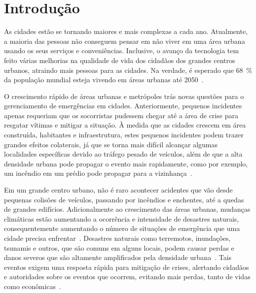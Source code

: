 \chapter{Introdução}\label{cap:introducao}

\begin{refsection}

As cidades estão se tornando maiores e mais complexas a cada ano. Atualmente, a maioria das pessoas não conseguem pensar em não viver em uma área urbana usando os seus serviços e conveniências. Inclusive, o avanço da tecnologia tem feito várias melhorias na qualidade de vida dos cidadãos dos grandes centros urbanos, atraindo mais pessoas para as cidades. Na verdade, é esperado que 68~\% da população mundial esteja vivendo em áreas urbanas até 2050~\cite{de_Amorim_2019}.

O crescimento rápido de áreas urbanas e metrópoles trás novas questões para o gerenciamento de emergências em cidades. Anteriormente, pequenos incidentes apenas requeriam que os socorristas pudessem chegar até a área de crise para resgatar vítimas e mitigar a situação. À medida que as cidades crescem em área construída, habitantes e infraestrutura, estes pequenos incidentes podem trazer grandes efeitos colaterais, já que se torna mais difícil alcançar algumas localidades específicas devido ao tráfego pesado de veículos, além de que a alta densidade urbana pode propagar o evento mais rapidamente, como por exemplo, um incêndio em um prédio pode propagar para a vizinhança~\cite{Ghosh201713}.

Em um grande centro urbano, não é raro acontecer acidentes que vão desde pequenas colisões de veículos, passando por incêndios e enchentes, até a quedas de grandes edifícios. Adicionalmente ao crescimento das áreas urbanas, mudanças climáticas estão aumentando a ocorrência e intensidade de desastres naturais, consequentemente aumentando o número de situações de emergência que uma cidade precisa enfrentar~\cite{boukerche2018smart}. Desastres naturais como terremotos, inundações, tsunamis e outros, que são comuns em alguns locais, podem causar perdas e danos severos que são altamente amplificados pela densidade urbana~\cite{Gosavi2020582}. Tais eventos exigem uma resposta rápida para mitigação de crises, alertando cidadãos e autoridades sobre os eventos que ocorrem, evitando mais perdas, tanto de vidas como econômicas~\cite{Costa_2019}.


\end{refsection}
